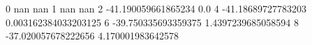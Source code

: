 0 nan nan
1 nan nan
2 -41.190059661865234 0.0
4 -41.18689727783203 0.003162384033203125
6 -39.750335693359375 1.4397239685058594
8 -37.020057678222656 4.170001983642578
